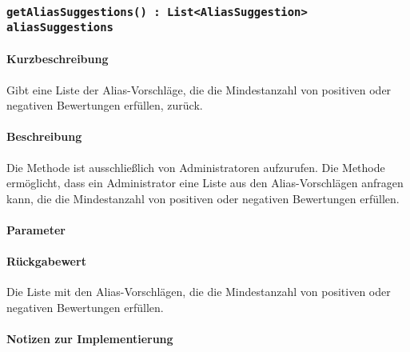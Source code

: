\subsubsection{\texttt{getAliasSuggestions() : List<AliasSuggestion> aliasSuggestions}}%
\paragraph*{Kurzbeschreibung}
Gibt eine Liste der Alias-Vorschläge, die die Mindestanzahl von positiven oder negativen Bewertungen erfüllen, zurück.
\paragraph*{Beschreibung}
Die Methode ist ausschließlich von Administratoren aufzurufen.
Die Methode ermöglicht, dass ein Administrator eine Liste aus den Alias-Vorschlägen anfragen kann, die die Mindestanzahl von positiven oder negativen Bewertungen erfüllen.
\paragraph*{Parameter}
\begin{itemize}
\end{itemize}
\paragraph*{Rückgabewert}
Die Liste mit den Alias-Vorschlägen, die die Mindestanzahl von positiven oder negativen Bewertungen erfüllen.

\paragraph*{Notizen zur Implementierung}%
